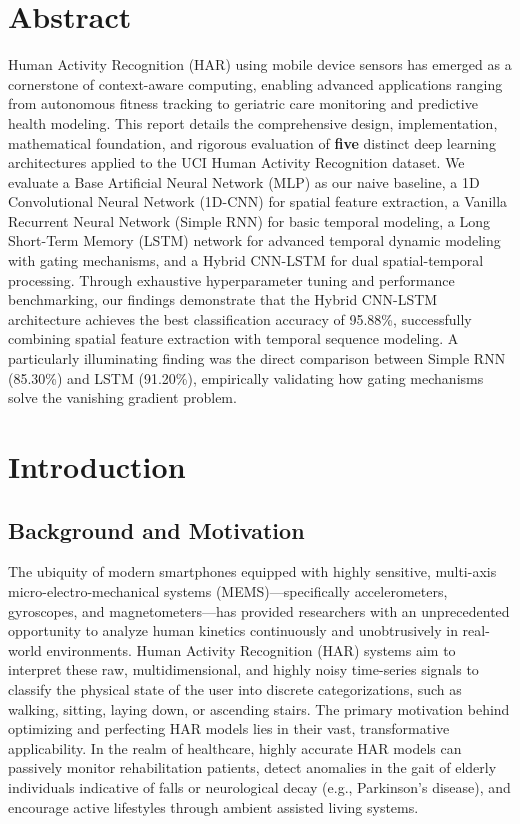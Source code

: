\documentclass[12pt,a4paper]{article}
\begin{document}
\section*{Abstract}
Human Activity Recognition (HAR) using mobile device sensors has emerged as a cornerstone of context-aware computing, enabling advanced applications ranging from autonomous fitness tracking to geriatric care monitoring and predictive health modeling. This report details the comprehensive design, implementation, mathematical foundation, and rigorous evaluation of \textbf{five} distinct deep learning architectures applied to the UCI Human Activity Recognition dataset. We evaluate a Base Artificial Neural Network (MLP) as our naive baseline, a 1D Convolutional Neural Network (1D-CNN) for spatial feature extraction, a Vanilla Recurrent Neural Network (Simple RNN) for basic temporal modeling, a Long Short-Term Memory (LSTM) network for advanced temporal dynamic modeling with gating mechanisms, and a Hybrid CNN-LSTM for dual spatial-temporal processing. Through exhaustive hyperparameter tuning and performance benchmarking, our findings demonstrate that the Hybrid CNN-LSTM architecture achieves the best classification accuracy of 95.88\%, successfully combining spatial feature extraction with temporal sequence modeling. A particularly illuminating finding was the direct comparison between Simple RNN (85.30\%) and LSTM (91.20\%), empirically validating how gating mechanisms solve the vanishing gradient problem.

\newpage
\section{Introduction}
\subsection{Background and Motivation}
The ubiquity of modern smartphones equipped with highly sensitive, multi-axis micro-electro-mechanical systems (MEMS)---specifically accelerometers, gyroscopes, and magnetometers---has provided researchers with an unprecedented opportunity to analyze human kinetics continuously and unobtrusively in real-world environments. Human Activity Recognition (HAR) systems aim to interpret these raw, multidimensional, and highly noisy time-series signals to classify the physical state of the user into discrete categorizations, such as walking, sitting, laying down, or ascending stairs. The primary motivation behind optimizing and perfecting HAR models lies in their vast, transformative applicability. In the realm of healthcare, highly accurate HAR models can passively monitor rehabilitation patients, detect anomalies in the gait of elderly individuals indicative of falls or neurological decay (e.g., Parkinson's disease), and encourage active lifestyles through ambient assisted living systems.
\end{document}
